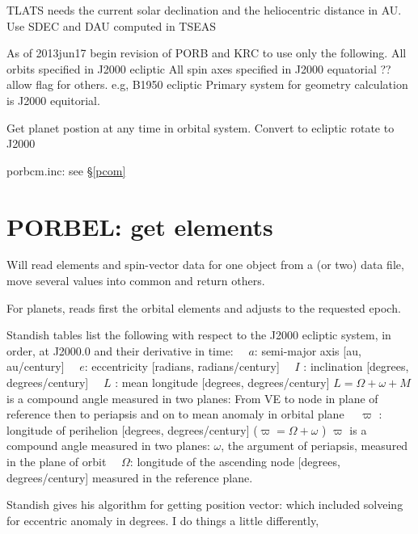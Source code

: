 \documentclass[draft]{article}
\begin{document}
TLATS needs the current solar declination and the heliocentric distance in AU.
\qi Use SDEC and DAU computed in TSEAS 

As of 2013jun17 begin revision of PORB and KRC to use only the following.
\qi All orbits specified in J2000 ecliptic
\qi All spin axes specified in J2000 equatorial
\qii ?? allow flag for others. e.g, B1950 ecliptic
\qi Primary system for geometry calculation is J2000 equitorial.

Get planet postion at any time in orbital system.
\qi Convert to ecliptic
\qi rotate to J2000 

porbcm.inc: see \S \ref{pcom}

\section{PORBEL: get elements} %
Will read elements and spin-vector data for one object from a (or two) data file, move several values into common and return others.

For planets, reads first the orbital elements and adjusts to the requested epoch. 

Standish tables list the following with respect to the J2000 ecliptic system, in order, at J2000.0 and their derivative in time:
 \ \ $a$: semi-major axis [au, au/century]
 \ \ $e$: eccentricity [radians, radians/century]
 \ \ $I$ : inclination [degrees, degrees/century]
 \ \ $L$ : mean longitude [degrees, degrees/century]
\qii   $L=\Omega +\omega + M$  is a compound angle measured in two planes: 
\qiii From VE to node in plane of reference
\qiii then to periapsis and on to mean anomaly in orbital plane
 \ \ $\varpi$ : longitude of perihelion [degrees, degrees/century] ($\varpi= \Omega+ \omega    $ ) 
\qii   $\varpi$ is a compound angle measured in two planes:
\qiii $\omega$, the argument of periapsis, measured in the plane of orbit 
 \ \ $\Omega$:  longitude of the ascending node [degrees, degrees/century]
\qii  measured in the reference plane.


Standish gives his algorithm for getting position vector: which included solveing for eccentric anomaly in degrees. I do things a little differently, 
\end{document}
